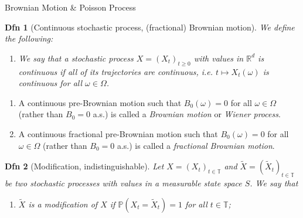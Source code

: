 \documentclass[a4paper]{article}
\theoremstyle{mytheoremstyle}
\newtheorem{definition}{Dfn}
\newcommand{\1}{\mathds{1}}
\begin{document}
\begin{multicols*}{3}
\begin{roundbox}{Brownian Motion \& Poisson Process}
  \begin{definition}[Continuous stochastic process, (fractional)
    Brownian motion]
    We define the following:
    \begin{enumerate}
      \item We say that a stochastic process $X = (X_t)_{t \geqslant
        0}$ with values in
        $\mathbb{R}^d$ is {\emph{continuous}} if all of its
        trajectories are continuous, i.e.
        $t \mapsto X_t (\omega)$ is continuous for all $\omega \in \Omega$.


    \end{enumerate}
  \end{definition}
\end{roundbox}

\begin{unlabeledbox}
  \begin{enumerate}[start = 2, parsep=0.1pt]
    \item A continuous pre-Brownian motion such that $B_0 (\omega) =
      0$ for all $\omega
      \in \Omega$ (rather than $B_0 = 0$ a.s.) is called a
      {\emph{Brownian motion}} or
      {\emph{Wiener process}}.

    \item A continuous fractional pre-Brownian motion such that $B_0
      (\omega) = 0$ for all
      $\omega \in \Omega$ (rather than $B_0 = 0$ a.s.) is called a
      {\emph{fractional
      Brownian motion}}.
  \end{enumerate}

  \begin{definition}[Modification, indistinguishable]
    Let $X = (X_t)_{t \in \mathbb{T}}$ and $\tilde{X} =
    (\tilde{X}_t)_{t \in \mathbb{T}}$ be
    two stochastic processes with values in a measurable state space
    $S$. We say that
    \begin{enumerate}[parsep=0.1pt]
      \item $\tilde{X}$ is a {\emph{modification}} of $X$ if
        $\mathbb{P} (X_t = \tilde{X}_t)
        = 1$ for all $t \in \mathbb{T}$;


\end{enumerate}
\end{definition}
\end{unlabeledbox}
\end{multicols*}
\end{document}
